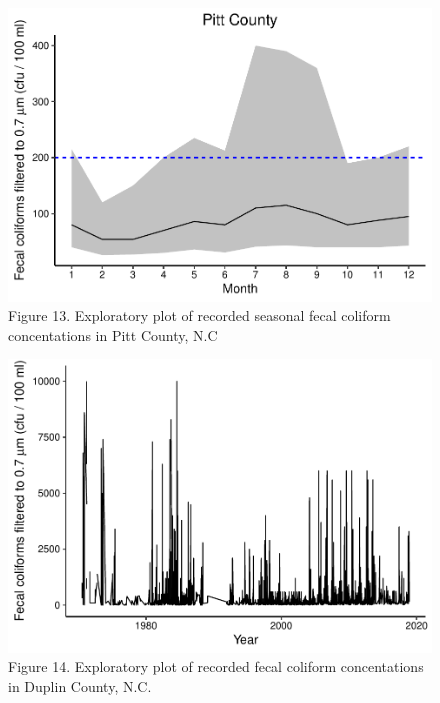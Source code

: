 \documentclass[12pt,]{article}
\begin{document}
\begin{figure}
\centering
\includegraphics{Edmondson_ENV872_Project_files/figure-latex/unnamed-chunk-12-1.pdf}
\caption{Figure 13. Exploratory plot of recorded seasonal fecal coliform
concentations in Pitt County, N.C}
\end{figure}

\begin{figure}
\centering
\includegraphics{Edmondson_ENV872_Project_files/figure-latex/unnamed-chunk-13-1.pdf}
\caption{Figure 14. Exploratory plot of recorded fecal coliform
concentations in Duplin County, N.C.}
\end{figure}
\end{document}
